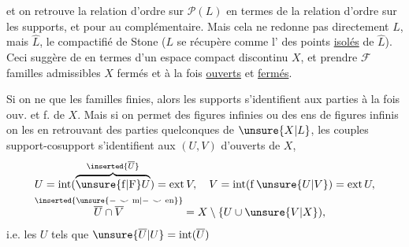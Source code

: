 et on retrouve la relation d'ordre sur $\mathcal P(L)$ en termes de la relation d'ordre sur les supports, et  pour  au complémentaire. Mais cela ne redonne pas directement $L$, mais $\widehat L$, le compactifié de Stone ($L$ se récupère  comme l' des points \uline{isolés} de $\widehat L$). Ceci suggère de   en termes d'un espace compact  discontinu $X$, et  prendre $\mathcal F$ familles admissibles  $X$ fermés et  à la fois \uline{ouverts} et \uline{fermés}.

Si on ne  que les familles finies, alors les supports   s'identifient aux parties à la fois ouv. et f. de $X$. Mais
si on permet des figures infinies ou des ens de figures infinis on les  en retrouvant   des parties  quelconques de $\unsure{X|L}$,  les  couples support-cosupport s'identifient aux   $(U,V)$ d'ouverts de $X$,
\[
\begin{aligned}
& U=\operatorname{int}(\overbrace{\unsure{\mathrm f|\mathrm F}U}^{\inserted{\overline U}})=\operatorname{ext}V,\quad
 V=\operatorname{int}(\mathrm f\,\unsure{U|V})=\operatorname{ext}U,\\
& \overset{\inserted{\unsure{-\ \smile\ \mathrm m|-\ \smile\ \mathrm{en}}}}{\overline U\cap\overline V} = X\setminus\{U\cup\unsure{V|X}),
\end{aligned}
\]
i.e. les  $U$ tels que $\unsure{\overline U|U}=\operatorname{int}(\overline U)$
